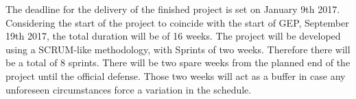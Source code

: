 The deadline for the delivery of the finished project is set on January 9th 2017. Considering the start of the project to coincide with the start of GEP, September 19th 2017, the total duration will be of 16 weeks. The project will be developed using a SCRUM-like methodology, with Sprints of two weeks. Therefore there will be a total of 8 sprints. There will be two spare weeks from the planned end of the project until the official defense. Those two weeks will act as a buffer in case any unforeseen circumstances force a variation in the schedule.